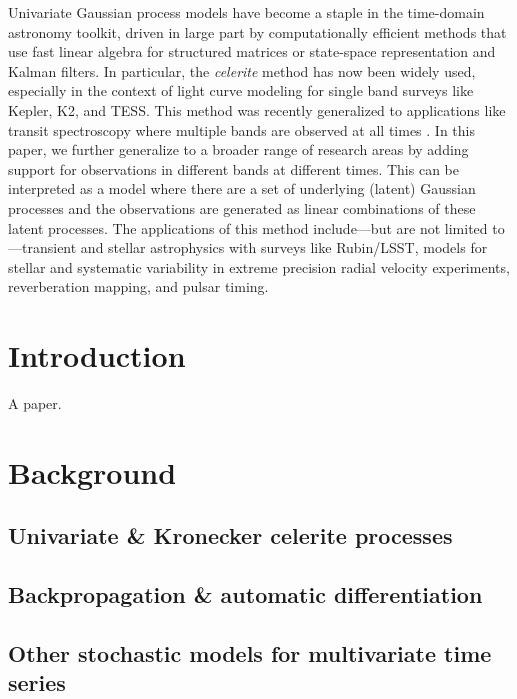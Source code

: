 \documentclass[10pt]{article}
\begin{document}
Univariate Gaussian process models have become a staple in the time-domain astronomy toolkit, driven in large part by computationally efficient methods that use fast linear algebra for structured matrices or state-space representation and Kalman filters.
In particular, the \emph{celerite} method \citep{foreman-mackey2017} has now been widely used, especially in the context of light curve modeling for single band surveys like Kepler, K2, and TESS.
This method was recently generalized to applications like transit spectroscopy where multiple bands are observed at all times \citep{gordon2020}.
In this paper, we further generalize to a broader range of research areas by adding support for observations in different bands at different times.
This can be interpreted as a model where there are a set of underlying (latent) Gaussian processes and the observations are generated as linear combinations of these latent processes.
The applications of this method include---but are not limited to---transient and stellar astrophysics with surveys like Rubin/LSST, models for stellar and systematic variability in extreme precision radial velocity experiments, reverberation mapping, and pulsar timing.

\section{Introduction}

A paper. \citep{foreman-mackey2017,foreman-mackey2018,gordon2020}

\citep{loper2020,hu2020}

\section{Background}

\subsection{Univariate \& Kronecker celerite processes}

\subsection{Backpropagation \& automatic differentiation}

\subsection{Other stochastic models for multivariate time series}
\end{document}
